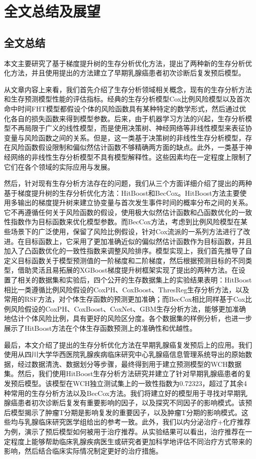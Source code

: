 \chapter{全文总结及展望}

\section{全文总结}
本文主要研究了基于梯度提升树的生存分析优化方法，提出了两种新的生存分析优化方法，并且使用提出的方法建立了早期乳腺癌患者初次诊断后复发预后模型。

从文章内容上来看，我们首先介绍了生存分析领域相关概念，现有的生存分析方法和生存预测模型性能的评估指标。经典的生存分析模型Cox比例风险模型以及首次命中时间FHT模型都假设个体的风险函数具有某种特定的数学形式，然后通过优化各自的损失函数来得到模型参数。后来，由于机器学习方法的兴起，生存分析模型不再局限于广义的线性模型，而是使用决策树、神经网络等非线性模型来表征协变量与风险函数之间的关系。但是，这一类基于决策树的非线性生存分析模型，存在风险函数假设限制和偏似然估计函数不够精确两方面的缺点。此外，一类基于神经网络的非线性生存分析模型不具有模型解释性。这些因素均在一定程度上限制了它们在各个领域的实际应用与发展。

然后，针对现有生存分析方法存在的问题，我们从三个方面详细介绍了提出的两种基于梯度提升树的生存分析优化方法：HitBoost和BecCox。HitBoost方法主要使用多输出的梯度提升树来建立协变量与首次发生事件时间的概率分布之间的关系。它不再遵循任何关于风险函数的假设，使用极大似然估计函数和凸函数优化的一致性指数作为目标函数来优化模型参数。而BecCox方法，考虑到比例风险模型在某些场景下的广泛使用，保留了风险比例假设，针对Cox流派的一系列方法进行了改进。在目标函数上，它采用了更加准确近似的偏似然估计函数作为目标函数，并且加入了凸函数优化的一致性指数来调整风险排序。模型实现上，我们首先推导了自定义目标函数关于模型预测值的一阶梯度和二阶梯度，然后根据预测目标的不同类型，借助灵活且易拓展的XGBoost梯度提升树框架实现了提出的两种方法。在设置了相关的数据集和实验后，四个公开的生存数据集上的实验结果表明：HitBoost相比一类遵循比例风险假设的CoxPH、CoxBoost、ThresReg生存分析方法，以及常用的RSF方法，对个体生存函数的预测更加准确；而BecCox相比同样基于Cox比例风险假设的CoxPH、CoxBoost、CoxNet、GBM生存分析方法，能够更加准确地估计个体风险比例，具有更好的风险区分度。各个数据集的样例分析，也进一步展示了HitBoost方法在个体生存函数预测上的准确性和优越性。

最后，本文介绍了提出的生存分析优化方法在早期乳腺癌复发预后上的应用。我们使用从四川大学华西医院乳腺疾病临床研究中心乳腺癌信息管理系统导出的原始数据，经过数据清洗、数据划分等步骤，最终得到用于建立预测模型的WCH数据集。然后，我们使用HitBoost生存分析方法研究并建立了针对早期乳腺癌患者的复发预后模型。该模型在WCH独立测试集上的一致性指数为0.72323，超过了其余4种常用的生存分析方法以及BecCox方法。我们将建立好的模型用于寻找对早期乳腺癌患者初次诊断后复发有重要影响的因子，以及探究不同因子的影响模式。该预后模型揭示了肿瘤T分期是影响复发的重要因子，以及肿瘤T分期的影响模式。这些均与乳腺临床研究医学组给出的参考一致。此外，我们以内分泌治疗+化疗推荐为例，演示了预后模型如何被用于治疗推荐。从实验结果可以看出，治疗推荐在一定程度上能够帮助临床乳腺疾病医生或研究者更加科学地评估不同治疗方式带来的影响，然后结合临床实际情况制定更好的治疗措施。

